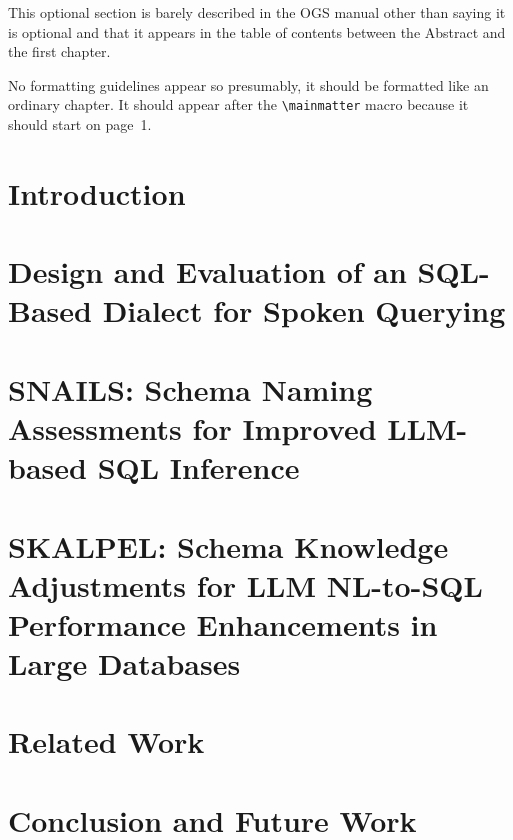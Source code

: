 \documentclass[12pt]{ucsddissertation}
\begin{document}
\mainmatter

\begin{dissertationintroduction}
This optional section is barely described in the OGS manual other than
saying it is optional and that it appears in the table of contents
between the Abstract and the first chapter.

No formatting guidelines appear so presumably, it should be formatted
like an ordinary chapter. It should appear after the
\verb!\mainmatter! macro because it should start on page~1.
\end{dissertationintroduction}

\chapter{Introduction}

\chapter{Design and Evaluation of an SQL-Based Dialect for Spoken Querying}



\chapter{SNAILS: Schema Naming Assessments for Improved LLM-based SQL Inference}



\chapter{SKALPEL: Schema Knowledge Adjustments for LLM NL-to-SQL Performance Enhancements in Large Databases}



\chapter{Related Work}


\chapter{Conclusion and Future Work}


\appendix

\backmatter

\end{document}
